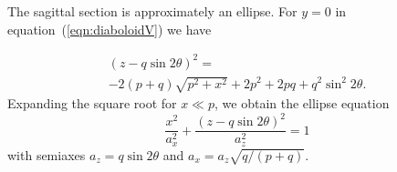 \documentclass[preprint]{iucr}       %
\begin{document}
The sagittal section is approximately an ellipse. For $y=0$ in equation~(\ref{eqn:diaboloidV}) we have

\begin{multline}
\label{eqn:ellipse}
(z - q \sin2\theta)^2 = \\
-2 (p + q) \sqrt{p^2 + x^2}+ 
2 p^2 +2 p q + q^2 \sin^2 2 \theta.
\end{multline}
Expanding the square root for $x\ll p$, we obtain the ellipse equation
\begin{equation}
\label{eqn:ellipse}
\frac{x^2}{a_x^2} + \frac{(z-q \sin2\theta)^2}{a_z^2}=1
\end{equation}
with semiaxes $a_z=q \sin2\theta$ and $a_x=a_z\sqrt{q/(p+q)}$.






% 
% 
% 
% 
\end{document}
